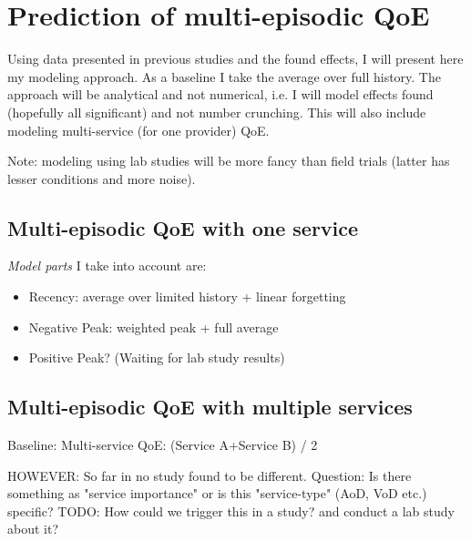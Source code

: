 \chapter{Prediction of multi-episodic QoE}\label{chap:modelling}
\begin{chapter-abstract}
Using data presented in previous studies and the found effects, I will present here my modeling approach.
As a baseline I take the average over full history.
The approach will be analytical and not numerical, i.e. I will model effects found (hopefully all significant) and not number crunching.
This will also include modeling multi-service (for one provider) QoE.

Note: modeling using lab studies will be more fancy than field trials (latter has lesser conditions and more noise).
\end{chapter-abstract}


\section{Multi-episodic QoE with one service}
\textit{Model parts} I take into account are:
\begin{itemize}
\item Recency: average over limited history + linear forgetting
\item Negative Peak: weighted peak + full average
\item Positive Peak? (Waiting for lab study results)
\end{itemize}

\section{Multi-episodic QoE with multiple services}
Baseline: Multi-service QoE: (Service A+Service B) / 2

HOWEVER: So far in no study found to be different.
Question: Is there something as "service importance" or is this "service-type" (AoD, VoD etc.) specific?
TODO: How could we trigger this in a study? and conduct a lab study about it?